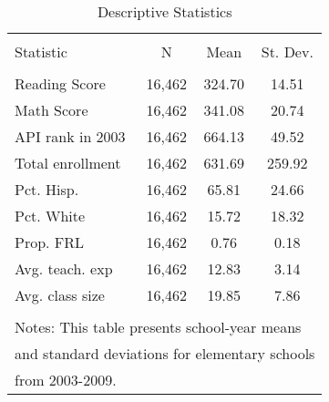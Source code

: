 
\begin{table}[!htbp] \centering 
  \caption{Descriptive Statistics} 
  \label{tab:descriptives} 
\begin{tabular}{@{\extracolsep{5pt}}lccc} 
\\[-1.8ex]\hline 
\hline \\[-1.8ex] 
Statistic & \multicolumn{1}{c}{N} & \multicolumn{1}{c}{Mean} & \multicolumn{1}{c}{St. Dev.} \\ 
\hline \\[-1.8ex] 
Reading Score & 16,462 & 324.70 & 14.51 \\ 
Math Score & 16,462 & 341.08 & 20.74 \\ 
API rank in 2003 & 16,462 & 664.13 & 49.52 \\ 
Total enrollment & 16,462 & 631.69 & 259.92 \\ 
Pct. Hisp. & 16,462 & 65.81 & 24.66 \\ 
Pct. White & 16,462 & 15.72 & 18.32 \\ 
Prop. FRL & 16,462 & 0.76 & 0.18 \\ 
Avg. teach. exp & 16,462 & 12.83 & 3.14 \\ 
Avg. class size & 16,462 & 19.85 & 7.86 \\ 
\hline \\[-1.8ex] 
\multicolumn{4}{l}{Notes: This table presents school-year means} \\ 
\multicolumn{4}{l}{and standard deviations for elementary schools} \\ 
\multicolumn{4}{l}{ from 2003-2009.} \\ 
\end{tabular} 
\end{table} 
